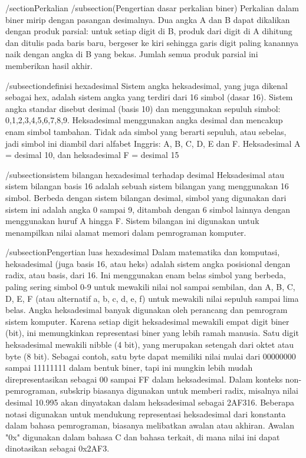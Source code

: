 /section{Perkalian}
/subsection(Pengertian dasar perkalian biner)
Perkalian dalam biner mirip dengan pasangan desimalnya. Dua angka A dan B dapat dikalikan dengan produk parsial: 
untuk setiap digit di B, produk dari digit di A dihitung dan ditulis pada baris baru, bergeser ke kiri sehingga 
garis digit paling kanannya naik dengan angka di B yang bekas. Jumlah semua produk parsial ini memberikan hasil akhir.

/subsection{definisi hexadesimal}
Sistem angka heksadesimal, yang juga dikenal sebagai hex, adalah sistem angka yang terdiri dari 16 simbol (dasar 16). 
Sistem angka standar disebut desimal (basis 10) dan menggunakan sepuluh simbol: 0,1,2,3,4,5,6,7,8,9. Heksadesimal 
menggunakan angka desimal dan mencakup enam simbol tambahan. Tidak ada simbol yang berarti sepuluh, atau sebelas, 
jadi simbol ini diambil dari alfabet Inggris: A, B, C, D, E dan F. Heksadesimal A = desimal 10, dan heksadesimal F = desimal 15

/subsection{sistem bilangan hexadesimal terhadap desimal}
Heksadesimal atau sistem bilangan basis 16 adalah sebuah sistem bilangan yang menggunakan 16 simbol. Berbeda dengan sistem bilangan desimal, simbol yang digunakan dari sistem ini adalah angka 0 sampai 9, ditambah dengan 6 simbol lainnya dengan menggunakan huruf A hingga F. Sistem bilangan ini digunakan untuk menampilkan nilai alamat memori dalam pemrograman komputer.

/subsection{Pengertian luas hexadesimal}
Dalam matematika dan komputasi, heksadesimal (juga basis 16, atau heks) adalah sistem angka posisional dengan radix, atau basis, dari 16. Ini menggunakan enam belas simbol yang berbeda, paling sering simbol 0-9 untuk mewakili nilai nol sampai sembilan, dan A, B, C, D, E, F (atau alternatif a, b, c, d, e, f) untuk mewakili nilai sepuluh sampai lima belas.
Angka heksadesimal banyak digunakan oleh perancang dan pemrogram sistem komputer. Karena setiap digit heksadesimal mewakili empat digit biner (bit), ini memungkinkan representasi biner yang lebih ramah manusia. Satu digit heksadesimal mewakili nibble (4 bit), yang merupakan setengah dari oktet atau byte (8 bit). Sebagai contoh, satu byte dapat memiliki nilai mulai dari 00000000 sampai 11111111 dalam bentuk biner, tapi ini mungkin lebih mudah direpresentasikan sebagai 00 sampai FF dalam heksadesimal.
Dalam konteks non-pemrograman, subskrip biasanya digunakan untuk memberi radix, misalnya nilai desimal 10.995 akan dinyatakan dalam heksadesimal sebagai 2AF316. Beberapa notasi digunakan untuk mendukung representasi heksadesimal dari konstanta dalam bahasa pemrograman, biasanya melibatkan awalan atau akhiran. Awalan "0x" digunakan dalam bahasa C dan bahasa terkait, di mana nilai ini dapat dinotasikan sebagai 0x2AF3.

